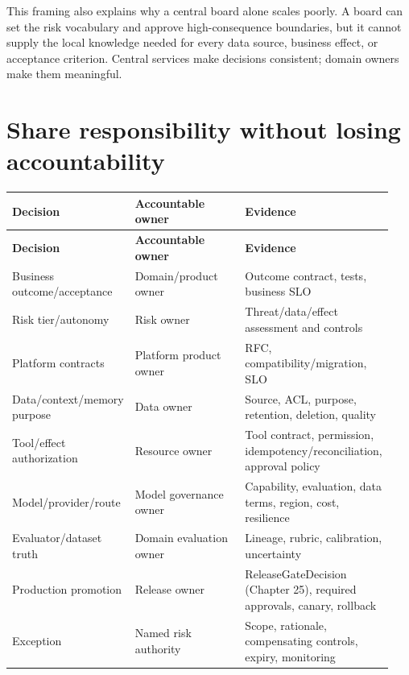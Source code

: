 This framing also explains why a central board alone scales poorly. A board can set the risk vocabulary and approve high-consequence boundaries, but it cannot supply the local knowledge needed for every data source, business effect, or acceptance criterion. Central services make decisions consistent; domain owners make them meaningful.\par

\section{Share responsibility without losing accountability}



\BookTableStart
\small
\begin{longtable}{@{}Y{0.3133\linewidth}Y{0.3133\linewidth}Y{0.3133\linewidth}@{}}
\color{white}\bfseries \textbf{Decision} & \color{white}\bfseries \textbf{Accountable owner} & \color{white}\bfseries \textbf{Evidence} \\
\endfirsthead
{}
\color{white}\bfseries \textbf{Decision} & \color{white}\bfseries \textbf{Accountable owner} & \color{white}\bfseries \textbf{Evidence} \\
\endhead
Business outcome/acceptance & Domain/product owner & Outcome contract, tests, business SLO \\
Risk tier/autonomy & Risk owner & Threat/data/effect assessment and controls \\
Platform contracts & Platform product owner & RFC, compatibility/migration, SLO \\
Data/context/memory purpose & Data owner & Source, ACL, purpose, retention, deletion, quality \\
Tool/effect authorization & Resource owner & Tool contract, permission, idempotency/reconciliation, approval policy \\
Model/provider/route & Model governance owner & Capability, evaluation, data terms, region, cost, resilience \\
Evaluator/dataset truth & Domain evaluation owner & Lineage, rubric, calibration, uncertainty \\
Production promotion & Release owner & ReleaseGateDecision (Chapter 25), required approvals, canary, rollback \\
Exception & Named risk authority & Scope, rationale, compensating controls, expiry, monitoring \\
\end{longtable}
\BookTableEnd

